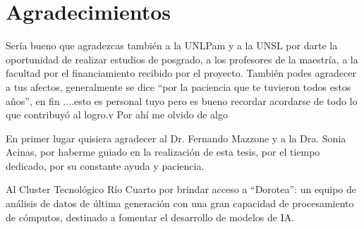 \chapter*{Agradecimientos}

{\color{green}
Sería bueno que agradezcas también a la UNLPam y  a la UNSL  por darte la oportunidad de realizar estudios de posgrado, a los profesores de la maestría, a la facultad por el financiamiento recibido por el proyecto. También podes agradecer a tus afectos, generalmente se dice ``por la paciencia que te tuvieron todos estos años'', en fin ....esto es personal tuyo pero es bueno recordar acordarse de todo lo que contribuyó al logro.v Por ahí me olvido de algo

}

En primer lugar quisiera agradecer al Dr. Fernando Mazzone y a la Dra. Sonia Acinas, por haberme guiado en la realización de esta tesis, por el tiempo dedicado, por su constante ayuda y paciencia. 

Al Cluster Tecnológico Río Cuarto por brindar acceso a “Dorotea”: un equipo de análisis de datos de última generación con una gran capacidad de procesamiento de cómputos, destinado a fomentar el desarrollo de modelos de IA.


